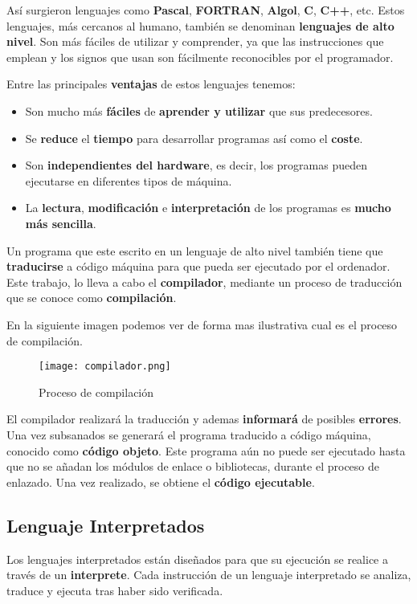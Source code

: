  Así surgieron lenguajes como \textbf{Pascal}, \textbf{FORTRAN}, \textbf{Algol}, \textbf{C}, \textbf{C++}, etc. Estos lenguajes, más cercanos al humano, también se denominan \textbf{lenguajes de alto nivel}. Son más fáciles de utilizar y comprender, ya que las instrucciones que emplean y los signos que usan son fácilmente reconocibles por el programador.

 Entre las principales \textbf{ventajas} de estos lenguajes tenemos:
 \begin{itemize}
     \item Son mucho más \textbf{fáciles} de \textbf{aprender y utilizar} que sus predecesores.
     \item Se \textbf{reduce} el \textbf{tiempo} para desarrollar programas así como el \textbf{coste}.
     \item Son \textbf{independientes del hardware}, es decir, los programas pueden ejecutarse en diferentes tipos de máquina.
     \item La \textbf{lectura}, \textbf{modificación} e \textbf{interpretación} de los programas es \textbf{mucho más sencilla}.
 \end{itemize}

Un programa que este escrito en un lenguaje de alto nivel también tiene que \textbf{traducirse} a código máquina para que pueda ser ejecutado por el ordenador. Este trabajo, lo lleva a cabo el \textbf{compilador}, mediante un proceso de traducción que se conoce como \textbf{compilación}.

En la siguiente imagen podemos ver de forma mas ilustrativa cual es el proceso de compilación.

\begin{figure}[H]
    \centering
    \texttt{[image: compilador.png]}
    \caption{Proceso de compilación}
\end{figure}

El compilador realizará la traducción y ademas \textbf{informará} de posibles \textbf{errores}. Una vez subsanados se generará el programa traducido a código máquina, conocido como \textbf{código objeto}. Este programa aún no puede ser ejecutado hasta que no se añadan los módulos de enlace o bibliotecas, durante el proceso de enlazado. Una vez realizado, se obtiene el \textbf{código ejecutable}.

\subsection{Lenguaje Interpretados}
Los lenguajes interpretados están diseñados para que su ejecución se realice a través de un \textbf{interprete}. Cada instrucción de un lenguaje interpretado se analiza, traduce y ejecuta tras haber sido verificada.


